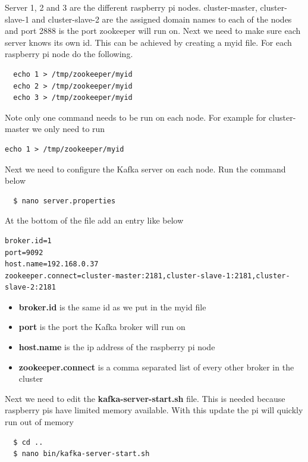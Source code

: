 Server 1, 2 and 3 are the different raspberry pi nodes. cluster-master, cluster-slave-1 and cluster-slave-2 are the assigned domain names to each of the nodes and port 2888 is the port zookeeper will run on. Next we need to make sure each server knows its own id. This can be achieved by creating a myid file. For each raspberry pi node do the following. 

\begin{verbatim}
  echo 1 > /tmp/zookeeper/myid
  echo 2 > /tmp/zookeeper/myid
  echo 3 > /tmp/zookeeper/myid
\end{verbatim}

Note only one command needs to be run on each node. For example for cluster-master we only need to run 

\begin{verbatim}
echo 1 > /tmp/zookeeper/myid
\end{verbatim}

Next we need to configure the Kafka server on each node. Run the command below

\begin{verbatim}
  $ nano server.properties
\end{verbatim}

At the bottom of the file add an entry like below

\begin{verbatim}
broker.id=1
port=9092
host.name=192.168.0.37
zookeeper.connect=cluster-master:2181,cluster-slave-1:2181,cluster-slave-2:2181
\end{verbatim}

\begin{itemize}
  \item \textbf{broker.id} is the same id as we put in the myid file
  \item \textbf{port} is the port the Kafka broker will run on
  \item \textbf{host.name} is the ip address of the raspberry pi node
  \item \textbf{zookeeper.connect} is a comma separated list of every other broker in the cluster
\end{itemize}

Next we need to edit the \textbf{kafka-server-start.sh} file. This is needed because raspberry pis have limited memory available. With this update the pi will quickly run out of memory

\begin{verbatim}
  $ cd ..
  $ nano bin/kafka-server-start.sh
\end{verbatim}

